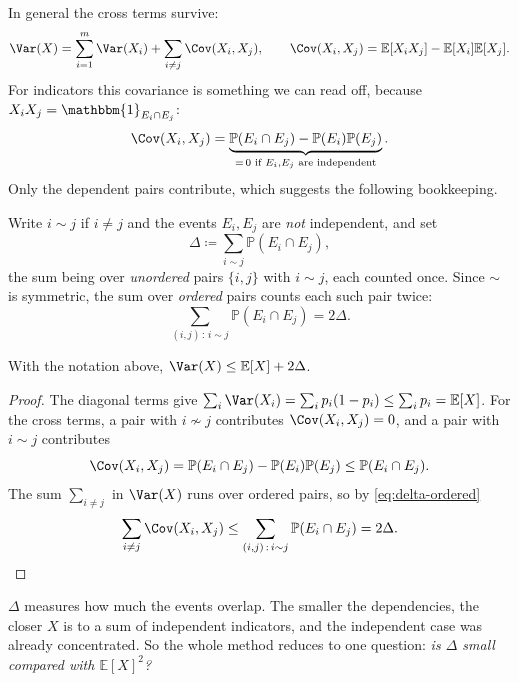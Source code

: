 In general the cross terms survive:
\[
    \Var(X) = \sum_{i=1}^{m} \Var(X_i) + \sum_{i \ne j} \Cov(X_i, X_j),
    \qquad
    \Cov(X_i, X_j) = \mathbb{E}[X_i X_j] - \mathbb{E}[X_i] \mathbb{E}[X_j].
\]
For indicators this covariance is something we can read off, because \(X_i X_j = \mathbbm{1}_{E_i \cap E_j}\):
\[
    \Cov(X_i, X_j) = \underbrace{\mathbb{P}(E_i \cap E_j) - \mathbb{P}(E_i) \mathbb{P}(E_j)}_{=\,0 \text{ if } E_i, E_j \text{ are independent}}.
\]
Only the dependent pairs contribute, which suggests the following bookkeeping.

\begin{definition}\label{def:delta}
    Write \(i \sim j\) if \(i \ne j\) and the events \(E_i, E_j\) are \emph{not} independent, and set
    \[
        \Delta \coloneqq \sum_{i \sim j} \mathbb{P}(E_i \cap E_j),
    \]
    the sum being over \emph{unordered} pairs \(\{i,j\}\) with \(i \sim j\), each counted once. Since \(\sim\) is symmetric, the sum over \emph{ordered} pairs counts each such pair twice:
    \begin{equation}\label{eq:delta-ordered}
        \sum_{(i,j) \,:\, i \sim j} \mathbb{P}(E_i \cap E_j) = 2\Delta .
    \end{equation}
\end{definition}

\begin{lemma}\label{lem:variance-indicators}
    With the notation above, \(\Var(X) \le \mathbb{E}[X] + 2\Delta\).
\end{lemma}

\begin{proof}
    The diagonal terms give \(\sum_i \Var(X_i) = \sum_i p_i(1-p_i) \le \sum_i p_i = \mathbb{E}[X]\). For the cross terms, a pair with \(i \not\sim j\) contributes \(\Cov(X_i,X_j) = 0\), and a pair with \(i \sim j\) contributes
    \[
        \Cov(X_i, X_j) = \mathbb{P}(E_i \cap E_j) - \mathbb{P}(E_i)\mathbb{P}(E_j) \le \mathbb{P}(E_i \cap E_j).
    \]
    The sum \(\sum_{i \ne j}\) in \(\Var(X)\) runs over ordered pairs, so by \eqref{eq:delta-ordered}
    \[
        \sum_{i \ne j} \Cov(X_i,X_j) \le \sum_{(i,j) \,:\, i \sim j} \mathbb{P}(E_i \cap E_j) = 2\Delta . \qedhere
    \]
\end{proof}

\begin{intuition}
    \(\Delta\) measures how much the events overlap. The smaller the dependencies, the closer \(X\) is to a sum of independent indicators, and the independent case was already concentrated. So the whole method reduces to one question: \emph{is \(\Delta\) small compared with \(\mathbb{E}[X]^{2}\)?}
\end{intuition}

